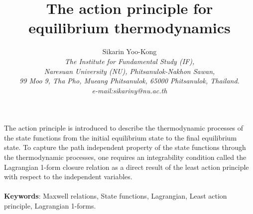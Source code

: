\documentclass[12pt]{article}
\numberwithin{equation}{section}
\theoremstyle{remark}
\theoremstyle{definition}
\begin{document}
	\title{\textbf{The action principle for equilibrium thermodynamics}}
	\author{Sikarin Yoo-Kong \\	
		\small  \emph{The Institute for Fundamental Study (IF),} \\
		\small\emph{Naresuan University (NU), Phitsanulok-Nakhon Sawan,}\\
		\small  \emph{99 Moo 9, Tha Pho, Mueang Phitsanulok, 65000 Phitsanulok, Thailand.}	\\
        \small\emph{e-mail:\;sikariny@nu.ac.th}
	}
	\date{}
	\maketitle
	\abstract
	The action principle is introduced to describe the thermodynamic processes of the state functions from the initial equilibrium state to the final equilibrium state. %
 To capture the path independent property of the state functions through the thermodynamic processes, one requires an integrability condition called the Lagrangian 1-form closure relation as a direct result of the least action principle with respect to the independent variables.
	\\
	\\
	\textbf{Keywords}: Maxwell relations, State functions, Lagrangian, Least action principle, Lagrangian 1-forms.
	
\end{document}
